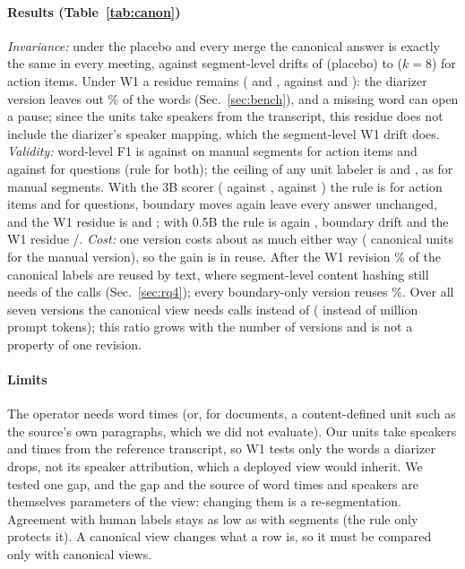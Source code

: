 \documentclass[conference]{IEEEtran}
\begin{document}
\paragraph*{Results (Table~\ref{tab:canon})} \emph{Invariance:} under the placebo and every merge the canonical answer
is exactly the same in every meeting, against segment-level drifts of
\nHtwomed{} (placebo) to \nEsixkeightQonemed{} ($k=8$) for action items. Under W1 a residue remains (\nCnPWoneDAc{} and
\nCnPWoneDQu, against \nHonemed{} and \nWoneQtwomed): the diarizer version leaves out \nDropWone\% of the words
(Sec.~\ref{sec:bench}), and a missing word can open a pause; since the units take speakers from the transcript,
this residue does not include the diarizer's speaker mapping, which the segment-level W1 drift does. \emph{Validity:} word-level F1 is \nCnPFoneAc{} against
\nCnPFoneSegAc{} on manual segments for action items and \nCnPFoneQu{} against \nCnPFoneSegQu{} for questions (rule
\nCnPKeepsAc{} for both); the ceiling of any unit labeler is \nCnPCeilAc{} and \nCnPCeilQu, as for manual segments.
With the 3B scorer (\nCnTFoneAc{} against \nCnTFoneSegAc, \nCnTFoneQu{} against \nCnTFoneSegQu) the rule is
\nCnTKeepsAc{} for action items and \nCnTKeepsQu{} for questions, boundary moves again leave every answer unchanged,
and the W1 residue is \nCnTWoneDAc{} and \nCnTWoneDQu; with 0.5B the rule is again \nCnHKeepsAc, boundary
drift \nCnHWtwoDAc{} and the W1 residue \nCnHWoneDAc/\nCnHWoneDQu. \emph{Cost:} one version costs about as much either way (\nCnPUnits{} canonical units for the
manual version), so the gain is in reuse. After the W1 revision \nCnPReuseWone\% of the canonical labels are reused
by text, where segment-level content hashing still needs \nEWonehashshare{} of the calls (Sec.~\ref{sec:rq4}); every
boundary-only version reuses \nCnPReuseBound\%. Over all seven versions the canonical view needs \nCnPCalls{} calls
instead of \nCnPSegCalls{} (\nCnPTok{} instead of \nCnPSegTok{} million prompt tokens); this ratio grows with the
number of versions and is not a property of one revision.
\paragraph*{Limits} The operator needs word times (or, for documents, a content-defined unit such as the source's own
paragraphs, which we did not evaluate). Our units take speakers and times from the reference transcript, so W1
tests only the words a diarizer drops, not its speaker attribution, which a deployed view would inherit. We tested one
gap, and the gap and the source of word times and speakers are themselves parameters of the view: changing them is a
re-segmentation. Agreement with human labels stays as low as with segments (the rule only protects it). A canonical
view changes what a row is, so it must be compared only with canonical views.
\end{document}

